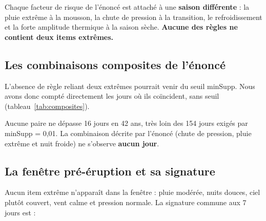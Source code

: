 \documentclass[12pt, a4paper]{article}
\newcommand{\itm}[1]{\texttt{#1}}
\newcommand{\tabin}[1]{\rowcolors{2}{GrisL}{white}}
\begin{document}
\begin{reponse}
Chaque facteur de risque de l'énoncé est attaché à une \textbf{saison différente} : la pluie
extrême à la mousson, la chute de pression à la transition, le refroidissement et la forte
amplitude thermique à la saison sèche. \textbf{Aucune des \NreglesBrutes{} règles ne contient
deux items extrêmes.}
\end{reponse}

\subsection{Les combinaisons composites de l'énoncé}
\label{sec:res_composites}

L'absence de règle reliant deux extrêmes pourrait venir du seuil minSupp. Nous avons donc
compté directement les jours où ils coïncident, sans seuil (tableau~\ref{tab:composites}).

\begin{table}[H]
\centering
\caption{Nombre de jours réunissant plusieurs facteurs de risque (1983--2024).}
\label{tab:composites}
\tabin{tab_composites}
\end{table}

Aucune paire ne dépasse 16 jours en 42 ans, très loin des 154 jours exigés par minSupp = 0,01.
La combinaison décrite par l'énoncé (chute de pression, pluie extrême et nuit froide) ne
s'observe \textbf{aucun jour}.

\subsection{La fenêtre pré-éruption et sa signature}
\label{sec:res_fenetre}

\begin{table}[H]
\centering
\caption{Les 7 jours précédant l'éruption (1984). Unités : mm, °C, °C, m/s, kPa. Tous les jours
sont aussi \itm{Season\_Monsoon\_Peak}, \itm{Rain\_Moderate}, \itm{Tmin\_Warm} et
\itm{Pressure\_Normal}.}
\label{tab:fenetre}
\tabin{tab_fenetre}
\end{table}

Aucun item extrême n'apparaît dans la fenêtre : pluie modérée, nuits douces, ciel plutôt
couvert, vent calme et pression normale. La signature commune aux 7 jours est :
\end{document}
